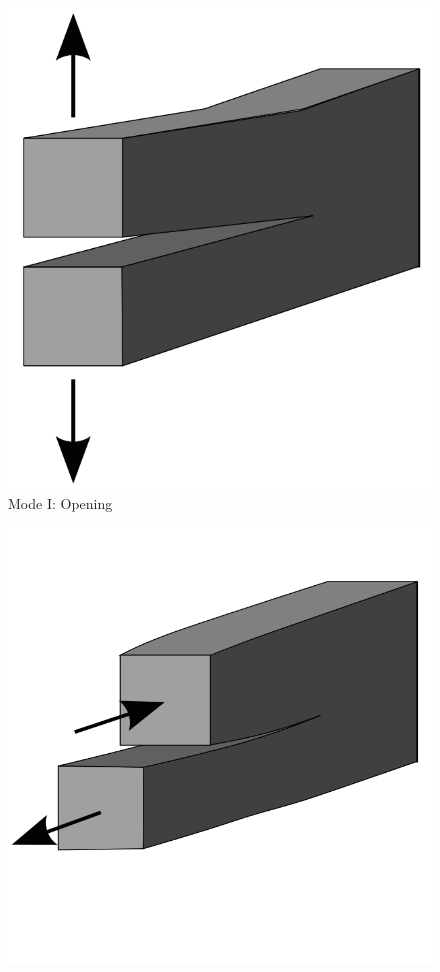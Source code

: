 \documentclass[cmfonts]{witpress}
\begin{document}
\begin{figure}
\centering
\begin{minipage}[b]{.3\columnwidth}
	\centering
	\includegraphics[width=\columnwidth]{figures/IMG_CUTRES/wikipedia_failure_modes_1}
			Mode I:	Opening
\end{minipage}
\hfill
\begin{minipage}[b]{.3\columnwidth}
	\centering
	\includegraphics[width=\columnwidth]{figures/IMG_CUTRES/wikipedia_failure_modes_2}

\end{minipage}
\end{figure}
\end{document}
